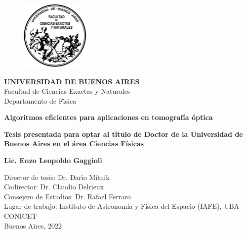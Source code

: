 

\begin{titlepage}
\begin{center}

\begin{figure}[htb]
\center
\includegraphics[width=0.3\textwidth]{figuras/Logo-fcenuba}
\end{figure}
{\bf UNIVERSIDAD DE BUENOS AIRES}\\
Facultad de Ciencias Exactas y Naturales\\
Departamento de F\'{\i}sica

\vspace*{0.5cm}
\begin{Large}
\textbf{Algoritmos eficientes para aplicaciones en tomografía óptica} \\
\end{Large}
\vspace*{0.5cm}
\textbf{Tesis presentada para optar al título de Doctor de la Universidad de 
Buenos Aires en el área Ciencias Físicas}\\

\begin{large}
\textbf{Lic. Enzo Leopoldo Gaggioli}\\
\end{large}

\vspace*{1.0cm}
\begin{flushleft}
Director de tesis: Dr. Dar\'{\i}o Mitnik\\
Codirector: Dr. Claudio Delrieux\\
Consejero de Estudios: Dr. Rafael Ferraro\\
\vspace*{0.5cm}
Lugar de trabajo: Instituto de Astronomía y Física del Espacio (IAFE), UBA--CONICET\\
\vspace*{0.5cm}
Buenos Aires, 2022
\end{flushleft}



\end{center}

\end{titlepage}

